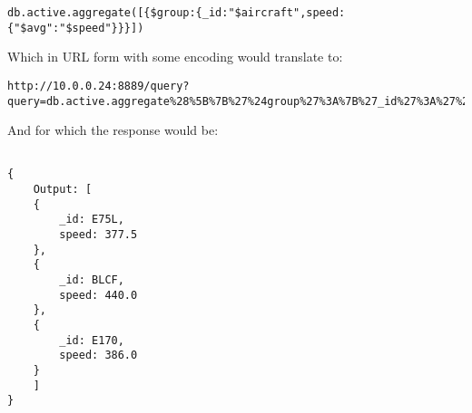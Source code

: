 \begin{code}
	\begin{verbatim}
db.active.aggregate([{$group:{_id:"$aircraft",speed:{"$avg":"$speed"}}}])
	\end{verbatim}
\end{code}

Which in URL form with some encoding would translate to:

\begin{code}
	\begin{verbatim}
http://10.0.0.24:8889/query?query=db.active.aggregate%28%5B%7B%27%24group%27%3A%7B%27_id%27%3A%27%24aircraft%27%2C%27speed%27%3A%7B%27%24avg%27%3A%27%24speed%27%7D%7D%7D%5D%29&user.name=airtraffic
	\end{verbatim}
\end{code}

And for which the response would be:

\begin{code}
	\begin{verbatim}

{
    Output: [
    {
        _id: E75L, 
        speed: 377.5
    }, 
    {
        _id: BLCF, 
        speed: 440.0
    }, 
    {
        _id: E170, 
        speed: 386.0
    }
    ]
}
	\end{verbatim}
\end{code}